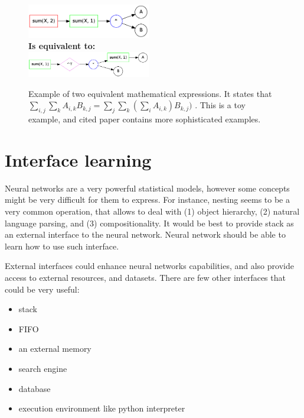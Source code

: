 \documentclass{article}
\begin{document}
\begin{figure}
  \centering
  \includegraphics[width=0.48\textwidth]{imgs/example1_brute.png}\\
  {\bf Is equivalent to:}\\
  \includegraphics[width=0.48\textwidth]{imgs/example1_opt.png}\\
  \caption{Example of two equivalent mathematical expressions. It states that
  $\sum_{i,j} \sum_k A_{i, k}B_{k, j} = \sum_{j} \sum_k (\sum_i A_{i, k})B_{k, j})$ \cite{zaremba2014learning}.
  This is a toy example, and cited paper contains more sophisticated examples.}
  \label{fig:ident}
\end{figure}


\section{Interface learning}
\label{sec:interface}
Neural networks are a very powerful statistical models, however
some concepts might be very difficult for them to express.
For instance, nesting seems to be a very common operation, that
allows to deal with (1) object hierarchy, (2) natural language parsing,
and (3) compositionality. It would be best to provide stack as an external
interface to the neural network. Neural network should be able to learn how
to use such interface. 

External interfaces could enhance neural networks capabilities, and also provide
access to external resources, and datasets.
There are few other interfaces that could be very useful:
\begin{itemize}
  \item stack
  \item FIFO
  \item an external memory \cite{weston2014memory, graves2014neural}
  \item search engine
  \item database
  \item execution environment like python interpreter
\end{itemize}
\end{document}
